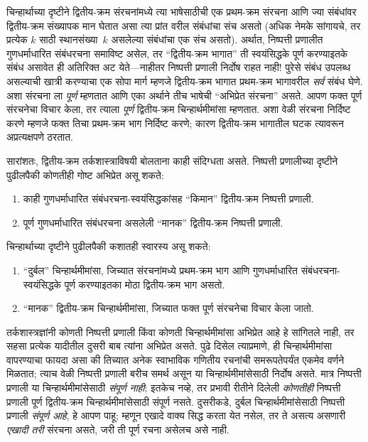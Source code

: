 चिन्हार्थाच्या दृष्टीने द्वितीय-क्रम संरचनांमध्ये त्या भाषेसाठीची एक
प्रथम-क्रम संरचना आणि ज्या संबंधांवर द्वितीय-क्रम संख्यापक मान घेतात
असा त्या प्रांत वरील संबंधांचा संच असतो (अधिक नेमके सांगायचे, तर प्रत्येक
$k$ साठी स्थानसंख्या~$k$ असलेल्या संबंधांचा एक संच असतो). अर्थात,
निष्पत्ती प्रणालीत गुणधर्माधारित संबंधरचना समाविष्ट असेल, तर
“द्वितीय-क्रम भागात” ती स्वयंसिद्धके पूर्ण करण्याइतके संबंध असावेत ही
अतिरिक्त अट येते---नाहीतर निष्पत्ती प्रणाली निर्दोष राहत नाही!{} पुरेसे
संबंध उपलब्ध असल्याची खात्री करण्याचा एक सोपा मार्ग म्हणजे द्वितीय-क्रम भागात
प्रथम-क्रम भागावरील \emph{सर्व} संबंध घेणे. अशा संरचना ला
\emph{पूर्ण} म्हणतात आणि एका अर्थाने तीच भाषेची “अभिप्रेत संरचना”
असते. आपण फक्त पूर्ण संरचनेचा विचार केला, तर त्याला
\emph{पूर्ण} द्वितीय-क्रम चिन्हार्थमीमांसा म्हणतात. अशा वेळी संरचना
निर्दिष्ट करणे म्हणजे फक्त तिचा प्रथम-क्रम भाग निर्दिष्ट करणे; कारण
द्वितीय-क्रम भागातील घटक त्यावरून अप्रत्यक्षपणे ठरतात.

सारांशतः, द्वितीय-क्रम तर्कशास्त्राविषयी बोलताना काही संदिग्धता असते.
निष्पत्ती प्रणालीच्या दृष्टीने पुढीलपैकी कोणतीही गोष्ट अभिप्रेत असू शकते:
\begin{enumerate}
\item काही गुणधर्माधारित संबंधरचना-स्वयंसिद्धकांसह “किमान” द्वितीय-क्रम
  निष्पत्ती प्रणाली.
\item पूर्ण गुणधर्माधारित संबंधरचना असलेली “मानक” द्वितीय-क्रम
  निष्पत्ती प्रणाली.
\end{enumerate}
चिन्हार्थाच्या दृष्टीने पुढीलपैकी कशातही स्वारस्य असू शकते:
\begin{enumerate}
\item “दुर्बल” चिन्हार्थमीमांसा, जिच्यात संरचनांमध्ये प्रथम-क्रम
  भाग आणि गुणधर्माधारित संबंधरचना-स्वयंसिद्धके पूर्ण करण्याइतका मोठा
  द्वितीय-क्रम भाग असतो.
\item “मानक” द्वितीय-क्रम चिन्हार्थमीमांसा, जिच्यात फक्त पूर्ण
  संरचनेचा विचार केला जातो.
\end{enumerate}
तर्कशास्त्रज्ञांनी कोणती निष्पत्ती प्रणाली किंवा कोणती चिन्हार्थमीमांसा
अभिप्रेत आहे हे सांगितले नाही, तर सहसा प्रत्येक यादीतील दुसरी बाब त्यांना
अभिप्रेत असते. पुढे दिसेल त्याप्रमाणे, ही चिन्हार्थमीमांसा वापरण्याचा फायदा असा
की तिच्यात अनेक स्वाभाविक गणितीय रचनांची समरूपतेपर्यंत एकमेव वर्णने मिळतात;
त्याच वेळी निष्पत्ती प्रणाली बरीच समर्थ असून या चिन्हार्थमीमांसेसाठी
निर्दोष असते. मात्र निष्पत्ती प्रणाली या चिन्हार्थमीमांसेसाठी
\emph{संपूर्ण नाही}; इतकेच नव्हे, तर प्रभावी रीतीने दिलेली \emph{कोणतीही}
निष्पत्ती प्रणाली पूर्ण द्वितीय-क्रम चिन्हार्थमीमांसेसाठी संपूर्ण नसते.
दुसरीकडे, दुर्बल चिन्हार्थमीमांसेसाठी निष्पत्ती प्रणाली \emph{संपूर्ण
आहे}, हे आपण पाहू; म्हणून एखादे वाक्य सिद्ध करता येत नसेल, तर ते असत्य असणारी
\emph{एखादी तरी} संरचना असते, जरी ती पूर्ण रचना असेलच असे नाही.

